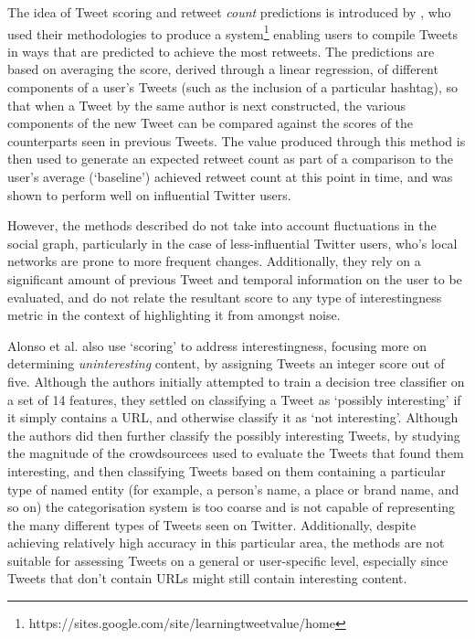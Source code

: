The idea of Tweet scoring and retweet \textit{count} predictions is introduced by \cite{gransee12}, who used their methodologies to produce a system\footnote{https://sites.google.com/site/learningtweetvalue/home} enabling users to compile Tweets in ways that are predicted to achieve the most retweets. The predictions are based on averaging the score, derived through a linear regression, of different components of a user's Tweets (such as the inclusion of a particular hashtag), so that when a Tweet by the same author is next constructed, the various components of the new Tweet can be compared against the scores of the counterparts seen in previous Tweets. The value produced through this method is then used to generate an expected retweet count as part of a comparison to the user's average (`baseline') achieved retweet count at this point in time, and was shown to perform well on influential Twitter users.

However, the methods described do not take into account fluctuations in the social graph, particularly in the case of less-influential Twitter users, who's local networks are prone to more frequent changes. Additionally, they rely on a significant amount of previous Tweet and temporal information on the user to be evaluated, and do not relate the resultant score to any type of interestingness metric in the context of highlighting it from amongst noise.

Alonso et al. \cite{alonso10} also use `scoring' to address interestingness, focusing more on determining \textit{uninteresting} content, by assigning Tweets an integer score out of five. Although the authors initially attempted to train a decision tree classifier on a set of 14 features, they settled on classifying a Tweet as `possibly interesting' if it simply contains a URL, and otherwise classify it as `not interesting'. Although the authors did then further classify the possibly interesting Tweets, by studying the magnitude of the crowdsourcees used to evaluate the Tweets that found them interesting, and then classifying Tweets based on them containing a particular type of named entity (for example, a person's name, a place or brand name, and so on) the categorisation system is too coarse and is not capable of representing the many different types of Tweets seen on Twitter. Additionally, despite achieving relatively high accuracy in this particular area, the methods are not suitable for assessing Tweets on a general or user-specific level, especially since Tweets that don't contain URLs might still contain interesting content.

